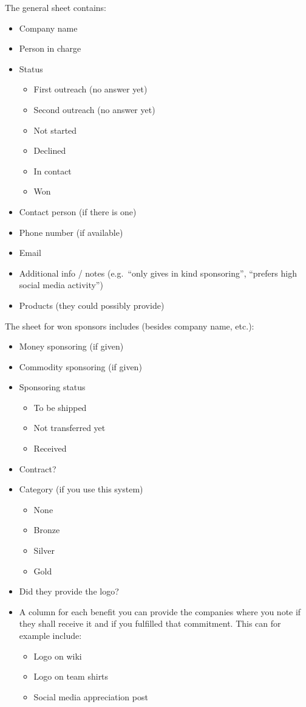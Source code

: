 \noindent The general sheet contains:
\begin{itemize}
    \item Company name
    \item Person in charge
    \item Status
    \begin{itemize}
        \item First outreach (no answer yet)
        \item Second outreach (no answer yet)
        \item Not started
        \item Declined
        \item In contact
        \item Won
    \end{itemize}
    \item Contact person (if there is one)
    \item Phone number (if available)
    \item Email
    \item Additional info / notes (e.g.\ ``only gives in kind sponsoring'', ``prefers high social media activity'')
    \item Products (they could possibly provide)
\end{itemize}
The sheet for won sponsors includes (besides company name, etc.):
\begin{itemize}
    \item Money sponsoring (if given)
    \item Commodity sponsoring (if given)
    \item Sponsoring status
    \begin{itemize}
        \item To be shipped
        \item Not transferred yet
        \item Received
    \end{itemize}
    \item Contract?
    \item Category (if you use this system)
    \begin{itemize}
        \item None
        \item Bronze
        \item Silver
        \item Gold
    \end{itemize}
    \item Did they provide the logo?
    \item A column for each benefit you can provide the companies where you note if they shall receive it and if you
    fulfilled that commitment.
    This can for example include:
    \begin{itemize}
        \item Logo on wiki
        \item Logo on team shirts
        \item Social media appreciation post
    \end{itemize}
\end{itemize}

